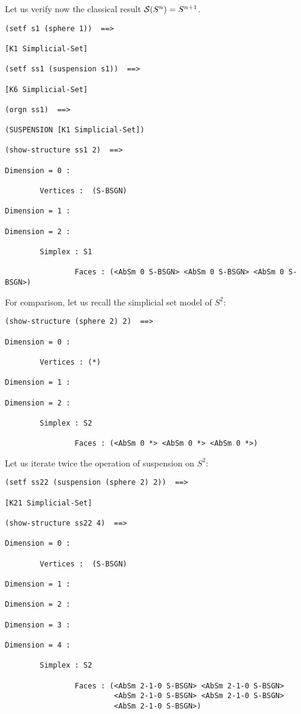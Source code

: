 Let us verify now the classical result ${\cal S}(S^n)=S^{n+1}$.
{\footnotesize\begin{verbatim}
(setf s1 (sphere 1))  ==>

[K1 Simplicial-Set]

(setf ss1 (suspension s1))  ==>

[K6 Simplicial-Set]

(orgn ss1)  ==>

(SUSPENSION [K1 Simplicial-Set])

(show-structure ss1 2)  ==>

Dimension = 0 :

        Vertices :  (S-BSGN)

Dimension = 1 :

Dimension = 2 :

        Simplex : S1

                Faces : (<AbSm 0 S-BSGN> <AbSm 0 S-BSGN> <AbSm 0 S-BSGN>)
\end{verbatim}}
For comparison, let us recall the simplicial set model of $S^2$:
{\footnotesize\begin{verbatim}
(show-structure (sphere 2) 2)  ==>

Dimension = 0 :

        Vertices : (*)

Dimension = 1 :

Dimension = 2 :

        Simplex : S2

                Faces : (<AbSm 0 *> <AbSm 0 *> <AbSm 0 *>)
\end{verbatim}}
Let us iterate twice the operation of suspension on $S^2$:
{\footnotesize\begin{verbatim}
(setf ss22 (suspension (sphere 2) 2))  ==>

[K21 Simplicial-Set]

(show-structure ss22 4)  ==>

Dimension = 0 :

        Vertices :  (S-BSGN)

Dimension = 1 :

Dimension = 2 :

Dimension = 3 :

Dimension = 4 :

        Simplex : S2

                Faces : (<AbSm 2-1-0 S-BSGN> <AbSm 2-1-0 S-BSGN>
                         <AbSm 2-1-0 S-BSGN> <AbSm 2-1-0 S-BSGN>
                         <AbSm 2-1-0 S-BSGN>)
\end{verbatim}}
